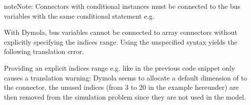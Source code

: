 \documentclass[letterpaper,10pt, openany,english]{sphinxmanual}
\begin{document}
\begin{sphinxadmonition}{note}{Note:}
Connectors with conditional instances must be connected to the bus variables with the same conditional statement e.g.

\begin{sphinxVerbatim}[commandchars=\\\{\}]
  
    \PYG{p}{[}\PYG{p}{],} \PYG{p}{[}\PYG{p}{])}
 
\end{sphinxVerbatim}

With Dymola, bus variables cannot be connected to array connectors without explicitly specifying the indices range.
Using the unspecified \sphinxcode{\sphinxupquote{{[}:{]}}} syntax yields the following translation error.

\begin{sphinxVerbatim}[commandchars=\\\{\}]
   \PYG{p}{[}\PYG{p}{]}       \PYG{p}{[}\PYG{p}{],} \PYG{p}{[}\PYG{p}{]);}
\end{sphinxVerbatim}

Providing an explicit indices range e.g. \sphinxcode{\sphinxupquote{{[}1:numZon{]}}} like in the previous code snippet only causes a translation warning: Dymola seems to allocate a default dimension of  to the connector, the unused
indices (from 3 to 20 in the example hereunder) are then removed from the simulation problem since they are not used in the model.

\begin{sphinxVerbatim}[commandchars=\\\{\}]
   \PYG{p}{[}\PYG{p}{]}        


\end{sphinxVerbatim}
\end{sphinxadmonition}
\end{document}
